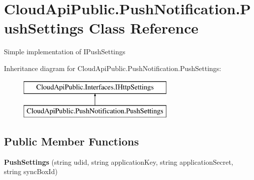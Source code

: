 \hypertarget{class_cloud_api_public_1_1_push_notification_1_1_push_settings}{\section{Cloud\-Api\-Public.\-Push\-Notification.\-Push\-Settings Class Reference}
\label{class_cloud_api_public_1_1_push_notification_1_1_push_settings}
}


Simple implementation of I\-Push\-Settings  


Inheritance diagram for Cloud\-Api\-Public.\-Push\-Notification.\-Push\-Settings\-:\begin{figure}[H]
\begin{center}
\leavevmode
\includegraphics[height=2.000000cm]{class_cloud_api_public_1_1_push_notification_1_1_push_settings}
\end{center}
\end{figure}
\subsection*{Public Member Functions}
\begin{DoxyCompactItemize}
\item 
\hypertarget{class_cloud_api_public_1_1_push_notification_1_1_push_settings_ac80297f7160a1c95a1f8a073078aa139}{{\bfseries Push\-Settings} (string udid, string application\-Key, string application\-Secret, string sync\-Box\-Id)}\label{class_cloud_api_public_1_1_push_notification_1_1_push_settings_ac80297f7160a1c95a1f8a073078aa139}

\end{DoxyCompactItemize}
